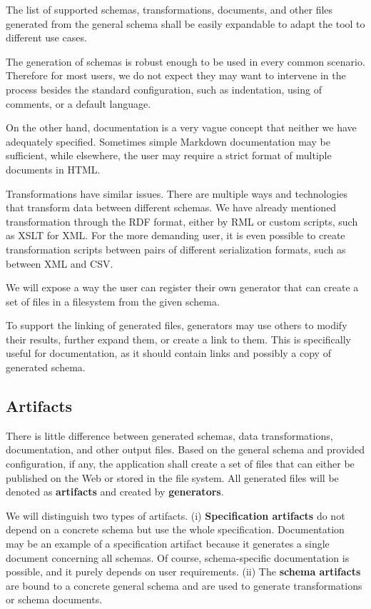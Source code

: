 \begin{requirement}
  The list of supported schemas, transformations, documents, and other files generated from the general schema shall be easily expandable to adapt the tool to different use cases.
\end{requirement}

The generation of schemas is robust enough to be used in every common scenario. Therefore for most users, we do not expect they may want to intervene in the process besides the standard configuration, such as indentation, using of comments, or a default language.

On the other hand, documentation is a very vague concept that neither we have adequately specified. Sometimes simple Markdown documentation may be sufficient, while elsewhere, the user may require a strict format of multiple documents in HTML.

Transformations have similar issues. There are multiple ways and technologies that transform data between different schemas. We have already mentioned transformation through the RDF format, either by RML or custom scripts, such as XSLT for XML. For the more demanding user, it is even possible to create transformation scripts between pairs of different serialization formats, such as between XML and CSV.

We will expose a way the user can register their own generator that can create a set of files in a filesystem from the given schema.

To support the linking of generated files, generators may use others to modify their results, further expand them, or create a link to them. This is specifically useful for documentation, as it should contain links and possibly a copy of generated schema.

\subsection{Artifacts}

There is little difference between generated schemas, data transformations, documentation, and other output files. Based on the general schema and provided configuration, if any, the application shall create a set of files that can either be published on the Web or stored in the file system. All generated files will be denoted as \textbf{artifacts} and created by \textbf{generators}.

We will distinguish two types of artifacts. (i) \textbf{Specification artifacts} do not depend on a concrete schema but use the whole specification. Documentation may be an example of a specification artifact because it generates a single document concerning all schemas. Of course, schema-specific documentation is possible, and it purely depends on user requirements. (ii) The \textbf{schema artifacts} are bound to a concrete general schema and are used to generate transformations or schema documents.

